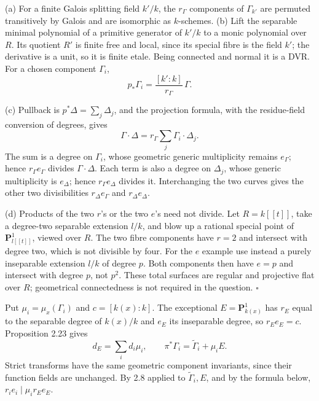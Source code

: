 \documentclass[11pt]{article}
\let\chapterexercise\exercise
\renewcommand{\exercise}[2]{\Needspace{8\baselineskip}\chapterexercise{#1}{#2}}
\begin{document}
\pf (a) For a finite Galois splitting field $k'/k$, the $r_\Gamma$ components of $\Gamma_{k'}$ are permuted transitively by Galois and are isomorphic as $k$-schemes. (b) Lift the separable minimal polynomial of a primitive generator of $k'/k$ to a monic polynomial over $R$. Its quotient $R'$ is finite free and local, since its special fibre is the field $k'$; the derivative is a unit, so it is finite etale. Being connected and normal it is a DVR. For a chosen component $\Gamma_i$,
\[ p_*\Gamma_i=\frac{[k':k]}{r_\Gamma}\,\Gamma. \]

(c) Pullback is $p^*\Delta=\sum_j\Delta_j$, and the projection formula, with the residue-field conversion of degrees, gives
\[ \Gamma\cdot\Delta=r_\Gamma\sum_j\Gamma_i\cdot\Delta_j. \]
The sum is a degree on $\Gamma_i$, whose geometric generic multiplicity remains $e_\Gamma$; hence $r_\Gamma e_\Gamma$ divides $\Gamma\cdot\Delta$. Each term is also a degree on $\Delta_j$, whose generic multiplicity is $e_\Delta$; hence $r_\Gamma e_\Delta$ divides it. Interchanging the two curves gives the other two divisibilities $r_\Delta e_\Gamma$ and $r_\Delta e_\Delta$.

(d) Products of the two $r$'s or the two $e$'s need not divide. Let $R=k[[t]]$, take a degree-two separable extension $l/k$, and blow up a rational special point of $\mathbf P^1_{l[[t]]}$, viewed over $R$. The two fibre components have $r=2$ and intersect with degree two, which is not divisible by four. For the $e$ example use instead a purely inseparable extension $l/k$ of degree $p$. Both components then have $e=p$ and intersect with degree $p$, not $p^2$. These total surfaces are regular and projective flat over $R$; geometrical connectedness is not required in the question. \hfill$\square$

\pf Put $\mu_i=\mu_x(\Gamma_i)$ and $c=[k(x):k]$. The exceptional $E=\mathbf P^1_{k(x)}$ has $r_E$ equal to the separable degree of $k(x)/k$ and $e_E$ its inseparable degree, so $r_Ee_E=c$. Proposition 2.23 gives
\[ d_E=\sum_i d_i\mu_i,\qquad \pi^*\Gamma_i=\widetilde\Gamma_i+\mu_i E. \]
Strict transforms have the same geometric component invariants, since their function fields are unchanged. By 2.8 applied to $\widetilde\Gamma_i,E$, and by the formula below, $r_ie_i\mid\mu_i r_Ee_E$.
\end{document}
